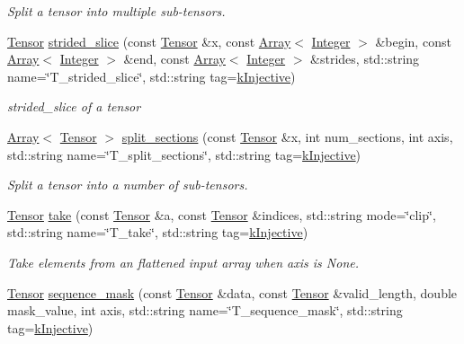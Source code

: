\begin{DoxyCompactItemize}
\begin{DoxyCompactList}\small\item\em Split a tensor into multiple sub-\/tensors. \end{DoxyCompactList}\item 
\hyperlink{classtvm_1_1te_1_1Tensor}{Tensor} \hyperlink{namespacetopi_a9ab808d1f2133511b6d9aaa4d4438e4c}{strided\+\_\+slice} (const \hyperlink{classtvm_1_1te_1_1Tensor}{Tensor} \&x, const \hyperlink{classtvm_1_1Array}{Array}$<$ \hyperlink{classtvm_1_1Integer}{Integer} $>$ \&begin, const \hyperlink{classtvm_1_1Array}{Array}$<$ \hyperlink{classtvm_1_1Integer}{Integer} $>$ \&end, const \hyperlink{classtvm_1_1Array}{Array}$<$ \hyperlink{classtvm_1_1Integer}{Integer} $>$ \&strides, std\+::string name=\char`\"{}T\+\_\+strided\+\_\+slice\char`\"{}, std\+::string tag=\hyperlink{namespacetopi_a60f05ec416e4618d25ad00dd9f536934}{k\+Injective})
\begin{DoxyCompactList}\small\item\em strided\+\_\+slice of a tensor \end{DoxyCompactList}\item 
\hyperlink{classtvm_1_1Array}{Array}$<$ \hyperlink{classtvm_1_1te_1_1Tensor}{Tensor} $>$ \hyperlink{namespacetopi_a286cebb686c9435f8f83cfc7b5ceaeff}{split\+\_\+sections} (const \hyperlink{classtvm_1_1te_1_1Tensor}{Tensor} \&x, int num\+\_\+sections, int axis, std\+::string name=\char`\"{}T\+\_\+split\+\_\+sections\char`\"{}, std\+::string tag=\hyperlink{namespacetopi_a60f05ec416e4618d25ad00dd9f536934}{k\+Injective})
\begin{DoxyCompactList}\small\item\em Split a tensor into a number of sub-\/tensors. \end{DoxyCompactList}\item 
\hyperlink{classtvm_1_1te_1_1Tensor}{Tensor} \hyperlink{namespacetopi_a00a3620077979f4234cac34ec21ab956}{take} (const \hyperlink{classtvm_1_1te_1_1Tensor}{Tensor} \&a, const \hyperlink{classtvm_1_1te_1_1Tensor}{Tensor} \&indices, std\+::string mode=\char`\"{}clip\char`\"{}, std\+::string name=\char`\"{}T\+\_\+take\char`\"{}, std\+::string tag=\hyperlink{namespacetopi_a60f05ec416e4618d25ad00dd9f536934}{k\+Injective})
\begin{DoxyCompactList}\small\item\em Take elements from an flattened input array when axis is None. \end{DoxyCompactList}\item 
\hyperlink{classtvm_1_1te_1_1Tensor}{Tensor} \hyperlink{namespacetopi_aa62a8900e1f0a3c48fcd81a5c591624f}{sequence\+\_\+mask} (const \hyperlink{classtvm_1_1te_1_1Tensor}{Tensor} \&data, const \hyperlink{classtvm_1_1te_1_1Tensor}{Tensor} \&valid\+\_\+length, double mask\+\_\+value, int axis, std\+::string name=\char`\"{}T\+\_\+sequence\+\_\+mask\char`\"{}, std\+::string tag=\hyperlink{namespacetopi_a60f05ec416e4618d25ad00dd9f536934}{k\+Injective})

\end{DoxyCompactItemize}
